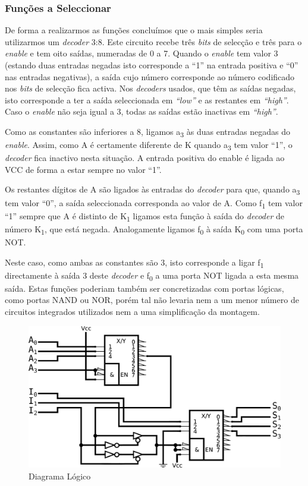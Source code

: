 \documentclass[a4paper,12pt]{article}
\begin{document}
\subsubsection{Funções a Seleccionar}
De forma a realizarmos as funções concluímos que o mais simples seria 
utilizarmos um {\it decoder} 3:8. Este circuito recebe três {\it bits} de 
selecção e três para o {\it enable} e tem oito saídas, numeradas de 0 a 7. 
Quando o {\it enable} tem valor 3 (estando duas entradas negadas isto 
corresponde a ``1'' na entrada positiva e ``0'' nas entradas negativas), a 
saída cujo número corresponde ao número codificado nos {\it bits} de 
selecção fica activa. Nos {\it decoders} usados, que têm as saídas negadas, 
isto corresponde a ter a saída seleccionada em {\it ``low''} e as restantes em 
{\it ``high''}. Caso o {\it enable} não seja igual a 3, todas as saídas 
estão inactivas em  {\it ``high''}.
\par
Como as constantes são inferiores a 8, ligamos a\textsubscript{3} às duas 
entradas negadas do {\it enable}. Assim, como A é certamente diferente de K 
quando a\textsubscript{3} tem valor ``1'', o {\it decoder} fica inactivo nesta 
situação. A entrada positiva do enable é ligada ao VCC de forma a estar 
sempre no valor ``1''. 
\par
Os restantes dígitos de A são ligados às entradas do {\it decoder} para que, 
quando a\textsubscript{3} tem valor ``0'', a saída seleccionada corresponda ao 
valor de A. Como f\textsubscript{1} tem valor ``1''  sempre que A é distinto 
de K\textsubscript{1} ligamos esta função à saída do {\it decoder} de 
número K\textsubscript{1}, que está negada. Analogamente ligamos 
f\textsubscript{0} à saída K\textsubscript{0} com uma porta NOT.
\par
Neste caso, como ambas as constantes são 3, isto corresponde a ligar 
f\textsubscript{1} directamente à saída 3 deste {\it decoder} e 
f\textsubscript{0} a uma porta NOT ligada a esta mesma saída. Estas funções 
poderiam também ser concretizadas com portas lógicas, como portas NAND ou 
NOR, porém tal não levaria nem a um menor número de circuitos integrados 
utilizados nem a uma simplificação da montagem.
\par

\begin{figure}
\centering
\includegraphics[scale=.1]{logigrama.eps}
\caption{Diagrama Lógico}
\end{figure}
\par
\par
\end{document}
